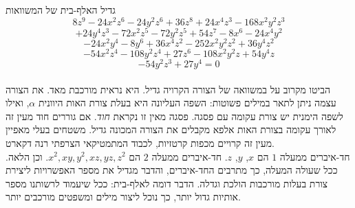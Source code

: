 \begin{surferPage}[גדיל]{גדיל}
האלף-בית של המשוואות
  \smallskip
\[8z^9-24x^2z^6-24y^2z^6+36z^8+24x^4z^3-168x^2y^2z^3\]
\[+24y^4z^3-72x^2z^5-72y^2z^5+54z^7-8x^6-24x^4y^2\]
\[-24x^2y^4-8y^6 + 36x^4z^2-252x^2y^2z^2+36y^4z^2\]
\[- 54x^2z^4-108y^2z^4 + 27z^6-108x^2y^2z + 54y^4z\]
\[-54y^2z^3 + 27y^4 = 0\]\\
\vspace{0,3cm}
הביטו מקרוב על במשוואה של הצורה הקרויה גדיל. היא נראית מורכבת מאד.
את הצורה עצמה ניתן לתאר במילים פשוטות: השפה העליונה היא בעלת צורת האות היוונית $\alpha$, ואילו לשפה הימנית יש צורת עקומה עם פסגה. פסגה מאין זו נקראת {\it חוד}. אם גוררים חוד מעין זה לאורך עקומה בצורת האות אלפא מקבלים את הצורה המכונה גדיל. משטחים בעלי מאפיין מעין זה קרויים מכפות קרטזיות, לכבוד המתמטיקאי הצרפתי רנה דקארט.\\
\vspace{0,3cm}
חד-איברים ממעלה $1$ הם $x$, $y$, $z$. חד-איברים ממעלה $2$ הם $x^2, xy, y^2, xz, yz, z^2$. וכן הלאה. ככל שעולה המעלה, כך מתרבים החד-איברים, והדבר מגדיל את מספר האפשרויות ליצירת צורת בעלות מורכבות הולכת וגדלה. הדבר דומה לאלף-בית: ככל שיעמוד לרשותנו מספר אותיות גדול יותר, כך נוכל ליצור מילים ומשפטים מורכבים יותר.
\end{surferPage}
